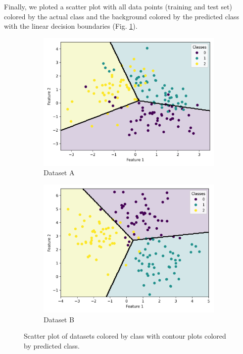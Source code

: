\documentclass{article}
\begin{document}
Finally, we ploted a scatter plot with all data points (training and test set) colored by the actual class and the background colored by the predicted class with the linear decision boundaries (Fig. \ref{fig:pred}).  

\begin{figure}[h]
  \centering
  \begin{subfigure}[t]{0.49\textwidth}
    \centering
    \includegraphics[width=\linewidth]{scatter_with_contour_A.png}
    \caption{Dataset A}
  \end{subfigure}
  \hfill
  \begin{subfigure}[t]{0.49\textwidth}
    \centering
    \includegraphics[width=\linewidth]{scatter_with_contour_B.png}
    \caption{Dataset B}
  \end{subfigure}
  \caption{Scatter plot of datasets colored by class with contour plots colored by predicted class.}
  \label{fig:pred}
\end{figure}
\end{document}
